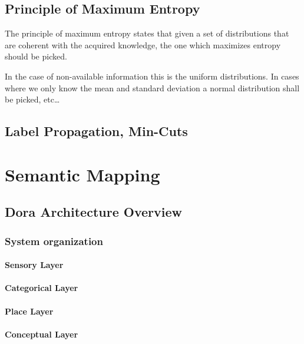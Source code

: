 \section{Principle of Maximum Entropy}
The principle of maximum entropy states that given a set of distributions that
are coherent with the acquired knowledge, the one which maximizes entropy should
be picked.

In the case of non-available information this is the uniform distributions.
In cases where we only know the mean and standard deviation a normal
distribution shall be picked, etc\dots

\section{Label Propagation, Min-Cuts}



\chapter{Semantic Mapping}\label{chap:semantic-mapping}

% 

\section{Dora Architecture Overview}
\subsection{System organization}
\subsubsection{Sensory Layer}
\subsubsection{Categorical Layer}
\subsubsection{Place Layer}
\subsubsection{Conceptual Layer}

